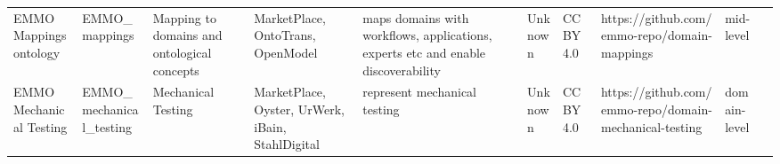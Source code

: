 \begin{tabular}{llllllllll}
                                                           EMMO Mappings ontology &           EMMO_mappings & Mapping to domains and ontological concepts &                                                                                                                                                                                                                                                                                                                                    MarketPlace, OntoTrans, OpenModel &                                                                                                                                                                                                                                                                                                                      maps domains with workflows, applications, experts etc and enable discoverability &                                                                                                            Unknown &                                    CC BY 4.0 &                                                      https://github.com/emmo-repo/domain-mappings  &         mid-level \\
                                                          EMMO Mechanical Testing & EMMO_mechanical_testing &                          Mechanical Testing &                                                                                                                                                                                                                                                                                                                     MarketPlace, Oyster, UrWerk, iBain, StahlDigital &                                                                                                                                                                                                                                                                                                                                                                           represent mechanical testing &                                                                                                            Unknown &                                    CC BY 4.0 &                                            https://github.com/emmo-repo/domain-mechanical-testing  &      domain-level \\

\end{tabular}
